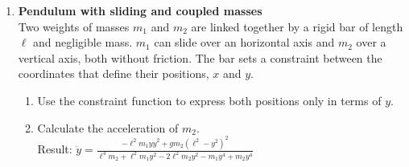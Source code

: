 \documentclass[11pt, a4paper, twoside]{article}
\begin{document}
\begin{enumerate}
	\item 
	\begin{minipage}[t][2.3cm]{0.75\textwidth}
		\textbf{Pendulum with sliding and coupled masses}\\ 
		Two weights of masses \(m_1\) and \(m_2\) are linked together by a rigid bar of length \(\ell\) and negligible mass.
		\(m_1\) can slide over an horizontal axis and \(m_2\) over a vertical axis, both without friction.
		The bar sets a constraint between the coordinates that define their positions, \(x\) and \(y\).
	\end{minipage}
	\begin{minipage}[c][1cm][t]{0.25\textwidth}
		
	\end{minipage}
	\begin{enumerate}
		\item Use the constraint function to express both positions only in terms of \(y\).
		\item Calculate the acceleration of \(m_2\).\\
		Result:
			$\ddot{y} = \frac{- \ell^{2} m_{1} y \dot{y}^{2} + g m_{2} \left(\ell^{2} - y^{2}\right)^{2}}{\ell^{4} m_{2} + \ell^{2} m_{1} y^{2} - 2 \ell^{2} m_{2} y^{2} - m_{1} y^{4} + m_{2} y^{4}}$
			\qquad
	\end{enumerate}
	


\end{enumerate}
\end{document}
